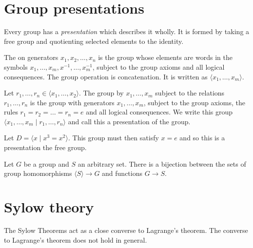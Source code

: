 \documentclass[12pt]{report}
\begin{document}
\section{Group presentations}
\label{sec:group-theory:group-presentations}

Every group has a \textit{presentation} which describes it wholly.
%
It is formed by taking a free group and quotienting selected elements to the identity.

\begin{definition}\label{def:group-theory:free-group}
  The  on generators \(x_{1}, x_{2}, \ldots, x_{n}\) is the group whose elements are words in the symbols \(x_{1}, \ldots, x_{m},x^{-1}, \ldots, x^{-1}_{m}\), subject to the group axioms and all logical consequences.
  The group operation is concatenation.
  It is written as \(\langle x_{1}, \ldots, x_{m} \rangle\).
\end{definition}

\begin{definition}
 \label{def:group-theory:generated-by-subject-to-relations}
 Let \(r_{1}, \ldots, r_{n} \in \langle x_{1}, \ldots, x_{2} \rangle\).
 The group  by \(x_{1}, \ldots, x_{m}\) subject to the relations \(r_{1}, \ldots, r_{n}\) is the group with generators \(x_{1}, \ldots, x_{m}\), subject to the group axioms, the rules \(r_{1} = r_{2}= \ldots = r_{n} = e\) and all logical consequences.
 We write this group \(\langle x_{1}, \ldots, x_{m} \mid r_{1}, \ldots, r_{n} \rangle\) and call this a presentation of the group.
\end{definition}

\begin{example}
  Let \(D = \langle x \mid x^{3} = x^{2} \rangle\).
  This group must then satisfy \(x=e\) and so this is a presentation the free group.
\end{example}

\begin{theorem}
  \label{thm:group-theory:universal-property-of-free-groups}
  Let \(G\) be a group and \(S\) an arbitrary set.
  There is a bijection between the sets of group homomorphisms \(\langle S \rangle \to G\) and functions \(G \to S\).
\end{theorem}



\section{Sylow theory}
The Sylow Theorems act as a close converse to Lagrange's theorem. The converse to Lagrange's theorem does not hold in general.
\end{document}
